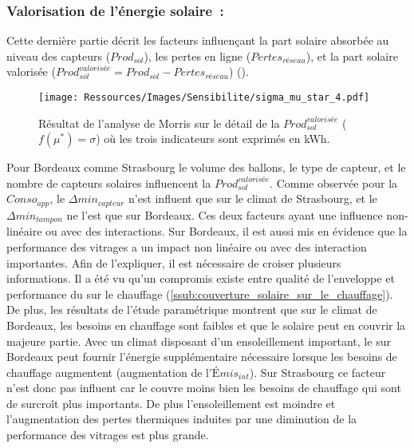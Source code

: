 \subsubsection{Valorisation de l’énergie solaire~:} %
\label{ssub:valorisation_de_l_energie_solaire}
Cette dernière partie décrit les facteurs influençant la part solaire absorbée au niveau
des capteurs ($Prod_{sol}$), les pertes en ligne ($Pertes_{réseau}$), et la part solaire
valorisée ($Prod_{sol}^{valorisée} = Prod_{sol} - Pertes_{réseau}$) ().

\begin{figure}
    \centering
    \texttt{[image: Ressources/Images/Sensibilite/sigma\_mu\_star\_4.pdf]}
    \caption[Résultat de l’analyse de Morris sur le détail de la
             $Prod_{sol}^{valorisée}$ ($f(\mu^{*}) = \sigma$)]
            {Résultat de l’analyse de Morris sur le détail de la
             $Prod_{sol}^{valorisée}$ ($f(\mu^{*}) = \sigma$) où les trois indicateurs sont exprimés
             en \si{kWh}.}
    \label{fig:prod_sol_valorisee_mu_star}
\end{figure}

Pour Bordeaux comme Strasbourg le volume des
ballons, le type de capteur, et le nombre de capteurs solaires influencent la
$Prod_{sol}^{valorisée}$. Comme observée pour la $Conso_{app}$, le $\Delta min_{capteur}$
n’est influent que sur le climat de Strasbourg, et le $\Delta min_{tampon}$ ne l’est que
sur Bordeaux. Ces deux facteurs ayant une influence non-linéaire ou avec des interactions.
Sur Bordeaux, il est aussi mis en évidence que la performance des vitrages a un impact non
linéaire ou avec des interaction importantes. Afin de l’expliquer, il est nécessaire de
croiser plusieurs informations. Il a été vu qu’un compromis existe entre qualité de
l’enveloppe et performance du  sur le chauffage
(\ref{ssub:couverture_solaire_sur_le_chauffage}). De plus, les résultats de l’étude
paramétrique montrent que sur le climat de Bordeaux, les besoins en chauffage sont faibles
et que le solaire peut en couvrir la majeure partie. Avec un climat disposant d’un
ensoleillement important, le  sur Bordeaux peut fournir l’énergie supplémentaire
nécessaire lorsque les besoins de chauffage augmentent (augmentation de l’$Émis_{int}$). Sur
Strasbourg ce facteur n’est donc pas influent car le  couvre moins bien les
besoins de chauffage qui sont de surcroît plus importants. De plus l’ensoleillement est
moindre et l’augmentation des pertes thermiques induites par une diminution de la
performance des vitrages est plus grande.

